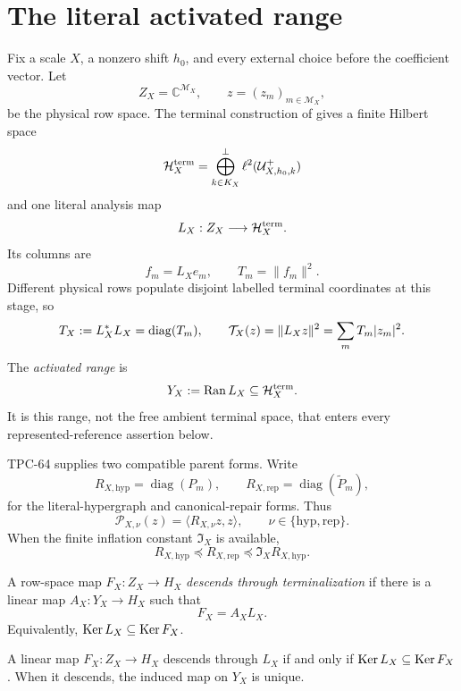 \section{The literal activated range}

Fix a scale \(X\), a nonzero shift \(h_0\), and every external choice before
the coefficient vector. Let
\[
 Z_X=\mathbb C^{\mathcal M_X},\qquad
 z=(z_m)_{m\in\mathcal M_X},
\]
be the physical row space. The terminal construction of
\citet{WangTPC64} gives a finite Hilbert space
\[
 \mathcal H_X^{\rm term}
 =\bigoplus_{k\in K_X}^{\perp}
   \ell^2(\mathcal U^+_{X,h_0,k})
\]
and one literal analysis map
\[
 L_X:Z_X\longrightarrow\mathcal H_X^{\rm term}.
\]
Its columns are
\[
 f_m=L_Xe_m,\qquad T_m=\|f_m\|^2.
\]
Different physical rows populate disjoint labelled terminal coordinates at
this stage, so
\begin{equation}\label{eq:terminal-diagonal}
 T_X:=L_X^*L_X=\operatorname{diag}(T_m),\qquad
 \mathcal T_X(z)=\|L_Xz\|^2=\sum_mT_m|z_m|^2.
\end{equation}
The \emph{activated range} is
\[
 Y_X:=\operatorname{Ran} L_X\subseteq\mathcal H_X^{\rm term}.
\]
It is this range, not the free ambient terminal space, that enters every
represented-reference assertion below.

TPC-64 supplies two compatible parent forms. Write
\[
 R_{X,\mathrm{hyp}}=\operatorname{diag}(P_m),\qquad
 R_{X,\mathrm{rep}}=\operatorname{diag}(\widetilde P_m),
\]
for the literal-hypergraph and canonical-repair forms. Thus
\[
 \mathcal P_{X,\nu}(z)=\langle R_{X,\nu}z,z\rangle,
 \qquad \nu\in\{\mathrm{hyp},\mathrm{rep}\}.
\]
When the finite inflation constant \(\mathfrak I_X\) is available,
\begin{equation}\label{eq:parent-order}
 R_{X,\mathrm{hyp}}\preceq R_{X,\mathrm{rep}}
 \preceq \mathfrak I_XR_{X,\mathrm{hyp}}.
\end{equation}

\begin{definition}
A row-space map \(F_X:Z_X\to H_X\) \emph{descends through terminalization} if
there is a linear map \(A_X:Y_X\to H_X\) such that
\[
 F_X=A_XL_X.
\]
Equivalently, \(\operatorname{Ker} L_X\subseteq\operatorname{Ker} F_X\).
\end{definition}

\begin{lemma}\label{lem:descent}
A linear map \(F_X:Z_X\to H_X\) descends through \(L_X\) if and only if
\(\operatorname{Ker} L_X\subseteq\operatorname{Ker} F_X\). When it descends, the induced map on \(Y_X\)
is unique.
\end{lemma}

